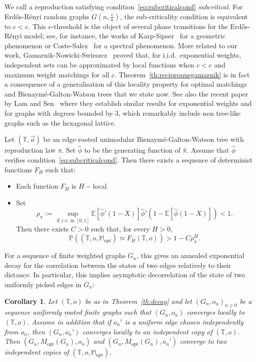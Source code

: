 \documentclass[11pt]{article}
\newtheorem{coro}{Corollary}[section]
\begin{document}
We call a reproduction satisfying condition~\eqref{eq:subcriticalcond} \emph{subcritical}.
For Erd\H{o}s-R\'enyi random graphs $G(n,\tfrac{c}{n})$, the sub-criticality condition is equivalent to $c<e$. This $e$-threshold is the object of several phase transitions for the Erd\H{o}s-R\'enyi model; see, for instance, the works of Karp-Sipser~\cite{Karp} for a geometric phenomenon or Coste-Salez~\cite{CS} for a spectral phenomenon. More related to our work, Gamarnik-Nowicki-Swirszcz~\cite{gamarnik2003maximum} proved that, for i.i.d.~exponential weights, independent sets can be approximated by local functions when $c<e$ and maximum weight matchings for all $c$. Theorem~\ref{th:reciproquegamarnik} is in fact a consequence of a generalisation of this locality property for optimal matchings and Bienaymé-Galton-Watson trees that we state now. See also the recent paper by Lam and Sen~\cite{correlationarnab} where they establish similar results for exponential weights and for graphs with degrees bounded by $3$, which remarkably include non tree-like graphs such as the hexagonal lattice. 
\begin{theorem} \label{th:decay}
    Let $(\mathbb{T},\overset{\rightarrow}{o})$ be an edge-rooted unimodular Bienaymé-Galton-Watson tree with reproduction law $\pi$.
    Set $\hat{\phi}$ to be the generating function of $\hat{\pi}$. Assume that $\hat{\phi}$ verifies condition~\eqref{eq:subcriticalcond}. Then there exists a sequence of determinist  functions $F_H$ such that:
    \begin{itemize}
        \item Each function $F_H$ is $H-$local
        \item Set \[ \rho_{\pi}:=\sup_{X \text{ r.v. in } [0,1]}\mathbb{E}\left[ \hat{\phi}'(1-X)\right] \hat{\phi}'\left(1-\mathbb{E}\left[\hat{\phi}(1-X)\right]\right)<1. \] Then there exists $C>0$ such that, for every $H >0$,
        \[\mathbb{P}\left((\mathbb{T},o,  \mathbb{M}_{\mathrm{opt}})\simeq F_H(\mathbb{T},o)\right)>1-C\rho_{\pi}^H.\]
    \end{itemize}
\end{theorem}

For a sequence of finite weighted graphs $G_n$, this gives an annealed exponential decay for the correlation between the states of two edges relatively to their distance. 
In particular, this implies asymptotic decorrelation of the state of two uniformly picked edges in $G_n$:

\begin{coro}\label{coro:indepasympt}
    Let $(\mathbb{T},o)$ be as in Theorem~\ref{th:decay} and let $(G_n,o_n)_{n\geq 0}$ be a sequence uniformly rooted finite graphs such that $(G_n,o_n)$ converges locally to $(\mathbb{T},o)$. Assume in addition that if $o_n'$ is a uniform edge chosen independently from $o_n$, then $(G_n,o_n')$ converges locally to an independent copy of $(\mathbb{T},o)$. 
    Then $(G_n,M_{\mathrm{opt}}(G_n),o_n)$ and $(G_n,M_{\mathrm{opt}}(G_n),o_n')$
    converge to two independent copies 
    of $(\mathbb{T},o,\mathbb{M}_{\mathrm{opt}})$.
\end{coro}
\end{document}
